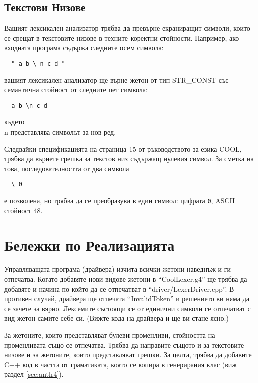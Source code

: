 \documentclass[11pt]{article}
\begin{document}
\subsection{Текстови Низове}

Вашият лексикален анализатор трябва да превърне екраниращит символи, които се срещат в текстовите низове в техните коректни стойности.
Например, ако входната програма съдържа следните осем символа:

\begin{verbatim}
  " a b \ n c d "
\end{verbatim}

\noindent вашият лексикален анализатор ще върне жетон от тип STR\_CONST със семантична стойност от следните пет символа:

\begin{verbatim}
  a b \n c d
\end{verbatim}

\noindent където \\n представлява символът за нов ред.

Следвайки спецификацията на страница 15 от ръководството за езика COOL, трябва да върнете грешка за текстов низ съдържащ нулевия символ.
За сметка на това, последователността от два символа

\begin{verbatim}
  \ 0
\end{verbatim}

\noindent е позволена, но трябва да се преобразува в един символ: цифрата \texttt{0}, ASCII стойност 48.

\section{Бележки по Реализацията}

Управляващата програма (драйвера) изчита всички жетони наведнъж и ги отпечатва.
Когато добавяте нови видове жетони в ``CoolLexer.g4'' ще трябва да добавяте и начина по който да се отпечатват в ``driver/LexerDriver.cpp''.
В противен случай, драйвера ще отпечата ``InvalidToken'' и решението ви няма да се зачете за вярно.
Лексемите състоящи се от единични символи се отпечатват с вид жетон самите себе си.
(Вижте кода на драйвера и ще ви стане ясно.)

За жетоните, които представляват булеви променливи, стойността на променливата също се отпечатва.
Трябва да направите същото и за текстовите низове и за жетоните, които представляват грешки.
За целта, трябва да добавите C++ код в частта от граматиката, която се копира в генерирания клас (виж раздел \ref{sec:antlr4}).
\end{document}
